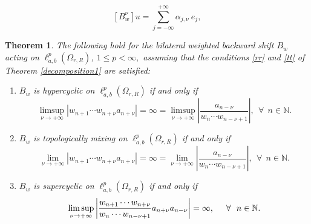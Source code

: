 \documentclass[10pt,a4paper]{amsart}
\newtheorem{theorem}{Theorem}
\begin{document}
\begin{equation}\label{cc}
   [B_{w}^{\nu}]u=\sum_{j=-\infty}^{+\infty} \alpha_{j,\nu} ~ e_{j},
\end{equation}

 \begin{theorem}\label{hyper5}
      The following hold for the bilateral weighted backward shift $B_{w}$ acting on  $\ell^{p}_{a,b}(\Omega_{r,R})$, $1\leq p<\infty,$ assuming that the conditions \eqref{rr} and \eqref{tt} of Theorem \ref{decomposition1} are satisfied:
     \begin{enumerate}
      \item[(i)] $B_{w}$ is hypercyclic on $\ell^{p}_{a,b}(\Omega_{r,R})$ if and only if
         \begin{equation}\label{hyperc}
              \limsup_{\nu\rightarrow +\infty}\left\lvert w_{n+1}\cdots w_{n+\nu}{a_{n+\nu}}   
 \right\rvert=\infty= \limsup_{\nu\rightarrow +\infty} \left\lvert \frac{a_{n-\nu}}{w_{n}\cdots w_{n-\nu+1}} \right\rvert,~~ \forall~~ n\in \mathbb{N}.
        \end{equation}
         \item[(ii)] $B_{w}$ is topologically mixing on $\ell^{p}_{a,b}(\Omega_{r,R})$ if and only if
         \begin{equation}\label{mixing}
         \lim_{\nu\rightarrow +\infty}\left\lvert w_{n+1}\cdots w_{n+\nu}{a_{n+\nu}}   
 \right\rvert=\infty= \lim_{\nu\rightarrow +\infty} \left\lvert \frac{a_{n-\nu}}{w_{n}\cdots w_{n-\nu+1}}\right\rvert,~~ \forall~~ n\in \mathbb{N}.
         \end{equation}

         \item[(iii)] $B_{w}$ is supercyclic on $\ell^{p}_{a,b}(\Omega_{r,R})$ if and only if
         \begin{equation}\label{superc}
         \limsup_{\nu\rightarrow +\infty} \left\lvert 
         \frac{w_{n+1}\cdots w_{n+\nu}}{w_{n}\cdots w_{n-\nu+1}}
          a_{n+\nu}a_{n-\nu}\right\rvert=\infty, \hskip .5cm \forall~~ n\in \mathbb{N}.
         \end{equation}
        \end{enumerate}
    \end{theorem}
\end{document}
